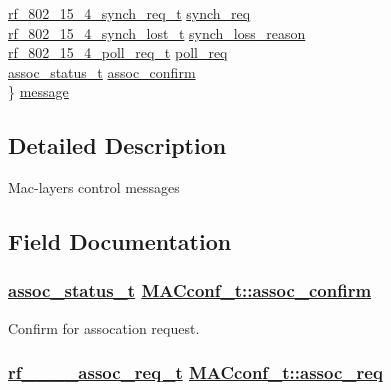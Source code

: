 \begin{CompactItemize}
\begin{tabbing}
\>\hyperlink{structrf__802__15__4__synch__req__t}{rf\_802\_15\_4\_synch\_req\_t} \hyperlink{structMACconf__t_52c0778c38fbd508c85c73b6843c34df}{synch\_req}\\
\>\hyperlink{structrf__802__15__4__synch__lost__t}{rf\_802\_15\_4\_synch\_lost\_t} \hyperlink{structMACconf__t_1e2659ba9ca3c9393ed0b6b4b4b095ec}{synch\_loss\_reason}\\
\>\hyperlink{structrf__802__15__4__poll__req__t}{rf\_802\_15\_4\_poll\_req\_t} \hyperlink{structMACconf__t_33c70a1389613a28534827454b214c78}{poll\_req}\\
\>\hyperlink{rf__802__15__4_8h_8dd8e855fea9627a62ab967a7b3b47af}{assoc\_status\_t} \hyperlink{structMACconf__t_1a8fef873257b76abe7e7058001a6ea9}{assoc\_confirm}\\
\} \hyperlink{structMACconf__t_6f1770beed1fc26677997b27799bb364}{message}\\

\end{tabbing}\end{CompactItemize}


\subsection{Detailed Description}
Mac-layers control messages 



\subsection{Field Documentation}
\hypertarget{structMACconf__t_1a8fef873257b76abe7e7058001a6ea9}{
\subsubsection[assoc\_\-confirm]{\setlength{\rightskip}{0pt plus 5cm}\hyperlink{rf__802__15__4_8h_8dd8e855fea9627a62ab967a7b3b47af}{assoc\_\-status\_\-t} \hyperlink{structMACconf__t_1a8fef873257b76abe7e7058001a6ea9}{MACconf\_\-t::assoc\_\-confirm}}}
\label{structMACconf__t_1a8fef873257b76abe7e7058001a6ea9}


Confirm for assocation request. \hypertarget{structMACconf__t_e47a1dd387bee08f7bacc39767ab40fb}{
\subsubsection[assoc\_\-req]{\setlength{\rightskip}{0pt plus 5cm}\hyperlink{structrf__802__15__4__assoc__req__t}{rf\_\_\_\_\-assoc\_\-req\_\-t} \hyperlink{structMACconf__t_e47a1dd387bee08f7bacc39767ab40fb}{MACconf\_\-t::assoc\_\-req}}}
\label{structMACconf__t_e47a1dd387bee08f7bacc39767ab40fb}


